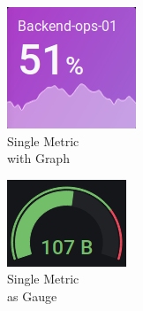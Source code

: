 \begin{figure}[ht]
	\begin{subfigure}{.25\textwidth}
		\centering
		\includegraphics[width=.8\linewidth]{assets/screenshots/Screenshot_2020-12-08 1 - New Features in v7 0 - Grafana.png}
		\captionsetup{justification=centering}
		\caption{Single Metric\\with Graph}
		\label{fig:sfig1}
	\end{subfigure}%
	\begin{subfigure}{.25\textwidth}
		\centering
		\includegraphics[width=.8\linewidth]{assets/screenshots/Screenshot_2020-12-08 Website trends - Grafana.png}
		\captionsetup{justification=centering}
		\caption{Single Metric\\as Gauge}
		\label{fig:sfig2}
	\end{subfigure}%
	\begin{subfigure}{.5\textwidth}
		\centering

\end{subfigure}
\end{figure}
